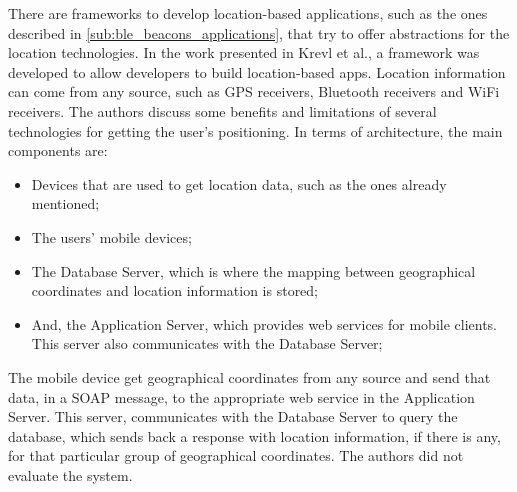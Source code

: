 There are frameworks to develop location-based
applications, such as the ones described in
\ref{sub:ble_beacons_applications}, that
try to offer abstractions for the location
technologies.
In the work presented in Krevl et al.\cite{Krevl2006},
a framework
was developed to allow developers to build
location-based apps. Location information can come
from any source, such as GPS receivers, Bluetooth
receivers and WiFi receivers.
The authors discuss some benefits and limitations
of several technologies for getting the
user's positioning.
In terms of architecture, the main components
are:
\begin{itemize}
\item
Devices that are used to get location data, such as
the ones already mentioned;
\item The users' mobile devices;
\item The Database Server, which is where the mapping
between geographical coordinates and location
information is stored;
\item And, the Application Server, which provides web services for
mobile clients. This server also communicates
with the Database Server;
\end{itemize}
The mobile device get geographical coordinates
from any source and send that data, in a
SOAP\cite{Seely:2001:SCP:560836} message,
to the appropriate web service in the Application
Server. This server, communicates with the Database Server
to query the database, which sends back a response with
location information, if there is any, for that
particular group of geographical coordinates.
The authors did not evaluate the system.

